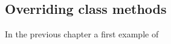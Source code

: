\subsection{Overriding class methods}

In the previous chapter a first example of 






























